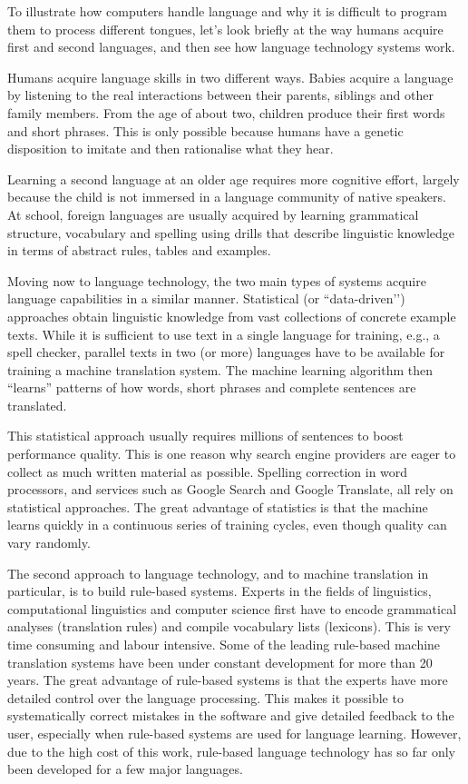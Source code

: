 \begin{multicols}{2}
To illustrate how computers handle language and why it is difficult to program them to process different tongues, let’s look briefly at the way humans acquire first and second languages, and then see how language technology systems work.

Humans acquire language skills in two different ways. Babies acquire a language by listening to the real interactions between their parents, siblings and other family members. From the age of about two, children produce their first words and short phrases. This is only possible because humans have a genetic disposition to imitate and then rationalise what they hear. 

Learning a second language at an older age requires more cognitive effort, largely because the child is not immersed in a language community of native speakers. At school, foreign languages are usually acquired by learning grammatical structure, vocabulary and spelling using drills that describe linguistic knowledge in terms of abstract rules, tables and examples.


Moving now to language technology, the two main types of systems acquire language capabilities in a similar manner. Statistical (or ``data-driven’') approaches obtain linguistic knowledge from vast collections of concrete example texts. While it is sufficient to use text in a single language for training, e.g., a spell checker, parallel texts in two (or more) languages have to be available for training a machine translation system. The machine learning algorithm then “learns” patterns of how words, short phrases and complete sentences are translated. 

This statistical approach usually requires millions of sentences to boost performance quality. This is one reason why search engine providers are eager to collect as much written material as possible. Spelling correction in word processors, and services such as Google Search and Google Translate, all rely on statistical approaches. The great advantage of statistics is that the machine learns quickly in a continuous series of training cycles, even though quality can vary randomly.

The second approach to language technology, and to machine translation in particular, is to build rule-based systems. Experts in the fields of linguistics, computational linguistics and computer science first have to encode grammatical analyses (translation rules) and compile vocabulary lists (lexicons). This is very time consuming and labour intensive. Some of the leading rule-based machine translation systems have been under constant development for more than 20 years. The great advantage of rule-based systems is that the experts have more detailed control over the language processing. This makes it possible to systematically correct mistakes in the software and give detailed feedback to the user, especially when rule-based systems are used for language learning. However, due to the high cost of this work, rule-based language technology has so far only been developed for a few major languages. 


\end{multicols}
